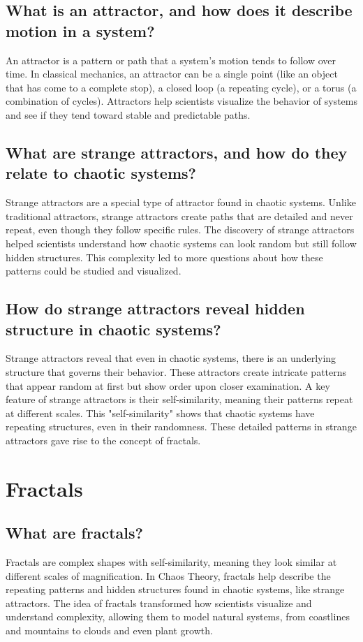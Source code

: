 \documentclass[12pt]{article}
\begin{document}
\subsection{What is an attractor, and how does it describe motion in a system?}
An attractor is a pattern or path that a system’s motion tends to follow over time. In classical mechanics, an attractor can be a single point (like an object that has come to a complete stop), a closed loop (a repeating cycle), or a torus (a combination of cycles). Attractors help scientists visualize the behavior of systems and see if they tend toward stable and predictable paths.

\subsection{What are strange attractors, and how do they relate to chaotic systems?}
Strange attractors are a special type of attractor found in chaotic systems. Unlike traditional attractors, strange attractors create paths that are detailed and never repeat, even though they follow specific rules. The discovery of strange attractors helped scientists understand how chaotic systems can look random but still follow hidden structures. This complexity led to more questions about how these patterns could be studied and visualized.

\subsection{How do strange attractors reveal hidden structure in chaotic systems?}
Strange attractors reveal that even in chaotic systems, there is an underlying structure that governs their behavior. These attractors create intricate patterns that appear random at first but show order upon closer examination. A key feature of strange attractors is their self-similarity, meaning their patterns repeat at different scales. This "self-similarity" shows that chaotic systems have repeating structures, even in their randomness. These detailed patterns in strange attractors gave rise to the concept of fractals.

\section{Fractals}
\subsection{What are fractals?}
Fractals are complex shapes with self-similarity, meaning they look similar at different scales of magnification. In Chaos Theory, fractals help describe the repeating patterns and hidden structures found in chaotic systems, like strange attractors. The idea of fractals transformed how scientists visualize and understand complexity, allowing them to model natural systems, from coastlines and mountains to clouds and even plant growth.
\end{document}
